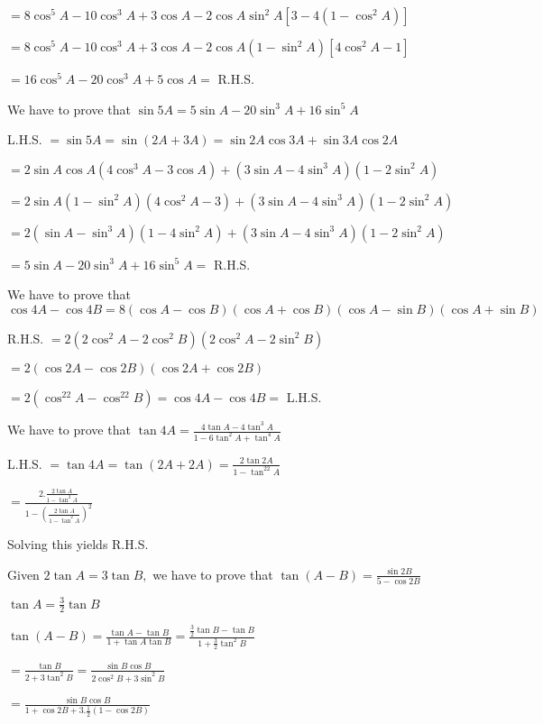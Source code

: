   $= 8\cos^5A - 10\cos^3A + 3\cos A - 2\cos A\sin^2A[3 - 4(1 - \cos^2A)]$

  $= 8\cos^5A - 10\cos^3A + 3\cos A - 2\cos A(1 - \sin^2A)[4\cos^2A - 1]$

  $= 16\cos^5A - 20\cos^3A + 5\cos A =$ R.H.S.

\item We have to prove that $\sin 5A = 5\sin A - 20\sin^3A + 16\sin^5A$

  L.H.S. $= \sin5A = \sin(2A + 3A) = \sin2A\cos3A + \sin3A\cos2A$

  $= 2\sin A\cos A(4\cos^3A - 3\cos A) + (3\sin A - 4\sin^3A)(1 - 2\sin^2A)$

  $= 2\sin A(1 - \sin^2A)(4\cos^2A - 3) + (3\sin A - 4\sin^3A)(1 - 2\sin^2A)$

  $= 2(\sin A - \sin^3A)(1 - 4\sin^2A) + (3\sin A - 4\sin^3A)(1 - 2\sin^2A)$

  $= 5\sin A - 20\sin^3A + 16\sin^5A =$ R.H.S.

\item We have to prove that $\cos 4A - \cos 4B = 8(\cos A - \cos B)(\cos A + \cos B)(\cos A - \sin B)(\cos A + \sin B)$

  R.H.S. $= 2(2\cos^2A - 2\cos^2B)(2\cos^2A - 2\sin^2B)$

  $= 2(\cos 2A - \cos 2B)(\cos 2A + \cos 2B)$

  $= 2(\cos^22A - \cos^22B) = \cos4A - \cos4B =$ L.H.S.

\item We have to prove that $\tan 4A = \frac{4\tan A - 4\tan^3A}{1 - 6\tan^2A + \tan^4A}$

  L.H.S. $= \tan 4A = \tan(2A + 2A) = \frac{2\tan2A}{1 - \tan^22A}$

  $= \frac{2.\frac{2\tan A}{1 - \tan^2A}}{1 - \left(\frac{2\tan A}{1 - \tan^2A}\right)^2}$

  Solving this yields R.H.S.

\item Given $2\tan A = 3\tan B,$ we have to prove that $\tan (A- B) = \frac{\sin 2B}{5 - \cos 2B}$

  $\tan A = \frac{3}{2}\tan B$

  $\tan(A - B) = \frac{\tan A - \tan B}{1 + \tan A\tan B} = \frac{\frac{3}{2}\tan B - \tan B}{1 + \frac{3}{2}\tan^2B}$

  $= \frac{\tan B}{2 + 3\tan^2B} = \frac{\sin B\cos B}{2\cos^2B + 3\sin^2B}$

  $= \frac{\sin B\cos B}{1 + \cos 2B + 3.\frac{1}{2}(1 - \cos 2B)}$

